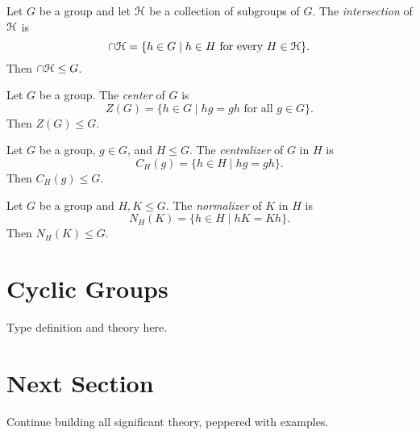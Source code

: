 \documentclass{amsart}
\begin{document}
\begin{Prob}
Let $G$ be a group and let $\EuScript{H}$ be a collection of subgroups of $G$.
The {\em intersection} of $\EuScript{H}$ is
\[ \cap \EuScript{H} = \{ h \in G \mid h \in H \text{ for every } H \in \EuScript{H} \} . \]
Then $\cap \EuScript{H} \le G$.
\end{Prob}

\begin{Prob}
Let $G$ be a group.  The {\em center} of $G$ is
\[ Z(G) = \{ h \in G \mid hg = gh \text{ for all } g \in G \} . \]
Then $Z(G) \le G$.
\end{Prob}

\begin{Prob}
Let $G$ be a group, $g \in G$, and $H \le G$.
The {\em centralizer} of $G$ in $H$ is
\[ C_H(g) = \{ h \in H \mid hg = gh \} . \]
Then $C_H(g) \le G$.
\end{Prob}

\begin{Prob}
Let $G$ be a group and $H,K \le G$.
The {\em normalizer} of $K$ in $H$ is
\[ N_H(K) = \{ h \in H \mid hK = Kh \} . \]
Then $N_H(K) \le G$.
\end{Prob}

\section{Cyclic Groups}

Type definition and theory here.

\section{Next Section}

Continue building all significant theory, peppered with examples.
\end{document}
